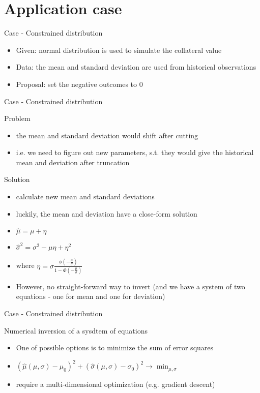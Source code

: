 \documentclass[presentation]{beamer}
\begin{document}
\section{Application case}
\label{sec-4}
\begin{frame}[label=sec-4-1]{Case - Constrained distribution}
\begin{itemize}
\item Given: normal distribution is used to simulate the collateral value
\item Data: the mean and standard deviation are used from historical observations
\item Proposal: set the negative outcomes to 0
\end{itemize}
\end{frame}
\begin{frame}[label=sec-4-2]{Case - Constrained distribution}
\begin{block}{Problem}
\begin{itemize}
\item the mean and standard deviation would shift after cutting
\item i.e. we need to figure out new parameters, s.t. they would give the historical mean and deviation after truncation
\end{itemize}
\end{block}
\begin{block}{Solution}
\begin{itemize}
\item calculate new mean and standard deviations
\item luckily, the mean and deviation have a close-form solution
\item $\hat{\mu} = \mu + \eta$
\item $\hat{\sigma}^2 = \sigma^2 - \mu\eta + \eta^2$
\item where $\eta = \sigma \frac{\phi(-\frac{\mu}{\sigma})}{1 - \Phi(-\frac{\mu}{\sigma})}$
\item However, no straight-forward way to invert (and we have a system of two equations - one for mean and one for deviation)
\end{itemize}
\end{block}
\end{frame}
\begin{frame}[label=sec-4-3]{Case - Constrained distribution}
\begin{block}{Numerical inversion of a sysdtem of equations}
\begin{itemize}
\item One of possible options is to minimize the sum of error squares
\item $(\hat{\mu}(\mu,\sigma) - \mu_0)^2 + (\hat{\sigma}(\mu,\sigma) - \sigma_0)^2 \rightarrow \min_{\mu,\sigma}$
\item require a multi-dimensional optimization (e.g. gradient descent)
\end{itemize}
\end{block}
\end{frame}
\end{document}
